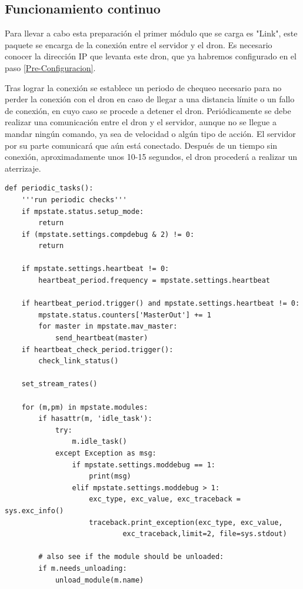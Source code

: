 \subsection{Funcionamiento continuo}

Para llevar a cabo esta preparación el primer módulo que se carga es "Link", este paquete se encarga de la conexión entre el servidor y el dron. Es necesario conocer la dirección IP que levanta este dron, que ya habremos configurado en el paso \ref{Pre-Configuracion}.

Tras lograr la conexión se establece un periodo de chequeo necesario para no perder la conexión con el dron en caso de llegar a una distancia límite o un fallo de conexión, en cuyo caso se procede a detener el dron. Periódicamente se debe realizar una comunicación entre el dron y el servidor, aunque no se llegue a mandar ningún comando, ya sea de velocidad o algún tipo de acción. El servidor por su parte comunicará que aún está conectado. Después de un tiempo sin conexión, aproximadamente unos 10-15 segundos, el dron procederá a realizar un aterrizaje. 

\begin{lstlisting}[frame=single]
def periodic_tasks():
    '''run periodic checks'''
    if mpstate.status.setup_mode:
        return
    if (mpstate.settings.compdebug & 2) != 0:
        return

    if mpstate.settings.heartbeat != 0:
        heartbeat_period.frequency = mpstate.settings.heartbeat

    if heartbeat_period.trigger() and mpstate.settings.heartbeat != 0:
        mpstate.status.counters['MasterOut'] += 1
        for master in mpstate.mav_master:
            send_heartbeat(master)
    if heartbeat_check_period.trigger():
        check_link_status()

    set_stream_rates()

    for (m,pm) in mpstate.modules:
        if hasattr(m, 'idle_task'):
            try:
                m.idle_task()
            except Exception as msg:
                if mpstate.settings.moddebug == 1:
                    print(msg)
                elif mpstate.settings.moddebug > 1:
                    exc_type, exc_value, exc_traceback = sys.exc_info()
                    traceback.print_exception(exc_type, exc_value, 
                    		exc_traceback,limit=2, file=sys.stdout)

        # also see if the module should be unloaded:
        if m.needs_unloading:
            unload_module(m.name)
\end{lstlisting}

